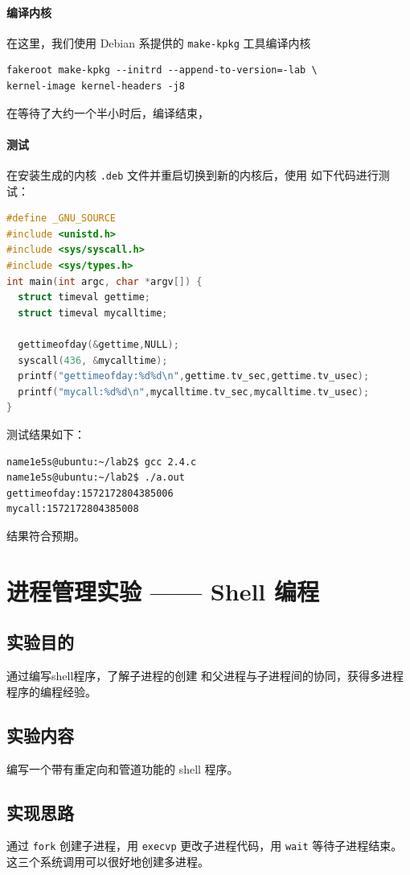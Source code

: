 \documentclass[blue,normal,cn]{elegantnote}
\newcommand{\code}[1]{\colorbox{light-gray}{\texttt{#1}}}
\begin{document}
\paragraph{编译内核}
在这里，我们使用 Debian 系提供的 \code{make-kpkg} 工具编译内核
\begin{lstlisting}
fakeroot make-kpkg --initrd --append-to-version=-lab \
kernel-image kernel-headers -j8
\end{lstlisting}
在等待了大约一个半小时后，编译结束，

\paragraph{测试}
在安装生成的内核 \code{.deb} 文件并重启切换到新的内核后，使用
如下代码进行测试：
\begin{lstlisting}[language=C]
#define _GNU_SOURCE
#include <unistd.h>
#include <sys/syscall.h>
#include <sys/types.h>
int main(int argc, char *argv[]) {
  struct timeval gettime;
  struct timeval mycalltime;
   
  gettimeofday(&gettime,NULL);
  syscall(436, &mycalltime);
  printf("gettimeofday:%d%d\n",gettime.tv_sec,gettime.tv_usec);
  printf("mycall:%d%d\n",mycalltime.tv_sec,mycalltime.tv_usec);
}
\end{lstlisting}

测试结果如下：
\begin{lstlisting}
name1e5s@ubuntu:~/lab2$ gcc 2.4.c 
name1e5s@ubuntu:~/lab2$ ./a.out 
gettimeofday:1572172804385006
mycall:1572172804385008
\end{lstlisting}
结果符合预期。

\section{进程管理实验 —— Shell 编程}
\subsection{实验目的}
通过编写shell程序，了解子进程的创建
和父进程与子进程间的协同，获得多进程程序的编程经验。
\subsection{实验内容}
编写一个带有重定向和管道功能的 shell 程序。
\subsection{实现思路}
通过 \code{fork} 创建子进程，用 \code{execvp} 
更改子进程代码，用 \code{wait} 等待子进程结束。
这三个系统调用可以很好地创建多进程。
\end{document}
